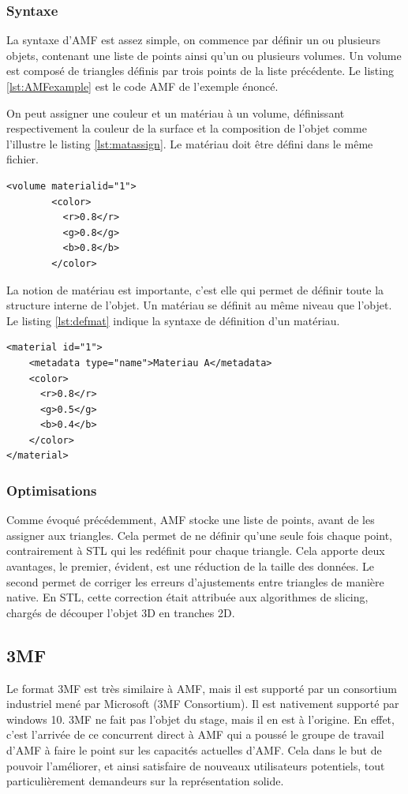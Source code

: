 \documentclass{tnreport}
\begin{document}
\subsubsection{Syntaxe}
La syntaxe d'AMF est assez simple, on commence par définir un ou plusieurs objets, contenant une liste de points ainsi qu'un ou plusieurs volumes. Un volume est composé de triangles définis par trois points de la liste précédente. Le listing \ref{lst:AMFexample} est le code AMF de l'exemple énoncé. 

On peut assigner une couleur et un matériau à un volume, définissant respectivement la couleur de la surface et la composition de l'objet comme l'illustre le listing \ref{lst:matassign}. Le matériau doit être défini dans le même fichier.
\begin{lstlisting}[language=AMF,caption={Assignation de couleur et matériau à un volume}, label={lst:matassign}]
<volume materialid="1">
        <color>
          <r>0.8</r>
          <g>0.8</g>
          <b>0.8</b>
        </color>
\end{lstlisting}
La notion de matériau est importante, c'est elle qui permet de définir toute la structure interne de l'objet. Un matériau se définit au même niveau que l'objet. Le listing \ref{lst:defmat} indique la syntaxe de définition d'un matériau.
\begin{lstlisting}[language=AMF,caption={Définition de matériau},label={lst:defmat}]
<material id="1">
    <metadata type="name">Materiau A</metadata>
    <color>
      <r>0.8</r>
      <g>0.5</g>
      <b>0.4</b>
    </color>
</material>
\end{lstlisting}
\subsubsection{Optimisations}
Comme évoqué précédemment, AMF stocke une liste de points, avant de les assigner aux triangles. Cela permet de ne définir qu'une seule fois chaque point, contrairement à STL qui les redéfinit pour chaque triangle. Cela apporte deux avantages, le premier, évident, est une réduction de la taille des données. Le second permet de corriger les erreurs d'ajustements entre triangles de manière native. En STL, cette correction était attribuée aux algorithmes de slicing, chargés de découper l'objet 3D en tranches 2D.
\subsection{3MF}
Le format 3MF est très similaire à AMF, mais il est supporté par un consortium industriel mené par Microsoft (3MF Consortium). Il est nativement supporté par windows 10. 3MF ne fait pas l'objet du stage, mais il en est à l'origine. En effet, c'est l'arrivée de ce concurrent direct à AMF qui a poussé le groupe de travail d'AMF à faire le point sur les capacités actuelles d'AMF. Cela dans le but de pouvoir l'améliorer, et ainsi satisfaire de nouveaux utilisateurs potentiels, tout particulièrement demandeurs sur la représentation solide. 
\end{document}
